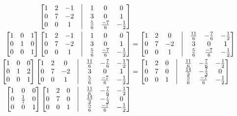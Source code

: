 \documentclass[12pt, letterpaper]{article}
\begin{document}
\begin{itemize}
\begin{enumerate}
\begin{align*}
\begin{bmatrix}
			1 & 2 & -1 & \bigm| & 1 & 0 &0\\ 0 & 7 & -2& \bigm| & 3 & 0 &1\\0 & 0 & 1& \bigm| & \frac{5}{6}& \frac{-7}{6} 
			&-\frac{1}{2}
			\end{bmatrix}\\
			\begin{bmatrix} 1 & 0 &1\\ 0 & 1 & 0\\ 0 & 0 & 1 \end{bmatrix}						
			\begin{bmatrix}
			1 & 2 & -1 & \bigm| & 1 & 0 &0\\ 0 & 7 & -2& \bigm| & 3 & 0 &1\\0 & 0 & 1& \bigm| & \frac{5}{6}& \frac{-7}{6} 
			&-\frac{1}{2}
			\end{bmatrix} &= \begin{bmatrix}
			1 & 2 & 0 & \bigm| & \frac{11}{6} & -\frac{7}{6} & -\frac{1}{2}\\ 0 & 7 & -2& \bigm| & 3 & 0 &1\\0 & 0 & 1& \bigm| & \frac{5}{6}& \frac{-7}{6} 
			&-\frac{1}{2}
			\end{bmatrix}\\
			\begin{bmatrix}
			1 & 0 & 0\\ 0 & 1 & 2\\ 0 & 0  & 1
			\end{bmatrix} \begin{bmatrix}
			1 & 2 & 0 & \bigm| & \frac{11}{6} & -\frac{7}{6} & -\frac{1}{2}\\ 0 & 7 & -2& \bigm| & 3 & 0 &1\\0 & 0 & 1& \bigm| & \frac{5}{6}& \frac{-7}{6} 
			&-\frac{1}{2}
			\end{bmatrix} &= 
			\begin{bmatrix}
			1 & 2 & 0 & \bigm| & \frac{11}{6} & -\frac{7}{6} & -\frac{1}{2}\\ 0 & 7 & 0& \bigm| & \frac{14}{3} & -\frac{7}{3} &0\\0 & 0 & 1& \bigm| & \frac{5}{6}& \frac{-7}{6} 
			&-\frac{1}{2}
			\end{bmatrix}\\
			\begin{bmatrix}
			1 & 0 & 0\\
			0 & \frac{1}{7} & 0\\
			0 & 0 & 1
			\end{bmatrix}
			\begin{bmatrix}
			1 & 2 & 0 & \bigm| & \frac{11}{6} & -\frac{7}{6} & -\frac{1}{2}\\ 0 & 7 & 0& \bigm| & \frac{14}{3} & -\frac{7}{3} &0\\0 & 0 & 1& \bigm| & \frac{5}{6}& \frac{-7}{6} &-\frac{1}{2}

\end{bmatrix}
\end{align*}
\end{enumerate}
\end{itemize}
\end{document}
